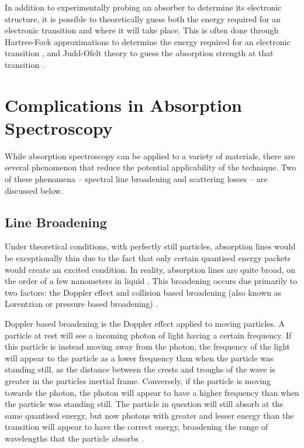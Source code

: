 In addition to experimentally probing an absorber to determine its electronic
structure, it is possible to theoretically guess both the energy required for
an electronic transition and where it will take place. This is often done
through Hartree-Fock approximations to determine the energy required for an
electronic transition \cite{Szabo:1996tu}, and Judd-Ofelt theory to guess the
absorption strength at that transition \cite{Judd:1962uq}.



\section{Complications in Absorption Spectroscopy}\label{sec:comp_abs}

While absorption spectroscopy can be applied to a variety of materials, there
are several phenomenon that reduce the potential applicability of the
technique. Two of these phenomena -- spectral line broadening and scattering
losses -- are discussed below.



\subsection{Line Broadening}\label{subsec:line_broad}

Under theoretical conditions, with perfectly still particles, absorption lines
would be exceptionally thin due to the fact that only certain quantised energy
packets would create an excited condition. In reality, absorption lines are
quite broad, on the order of a few nanometers in liquid \cite{Hollas:2004uh}.
This broadening occurs due primarily to two factors: the Doppler effect
and collision based broadening (also known as Lorentzian or pressure based
broadening) \cite{Olivero:1977ul}.

Doppler based broadening is the Doppler effect applied to moving particles.
A particle at rest will see a incoming photon of light having a certain
frequency. If this particle is instead moving away from the photon, the
frequency of the light will appear to the particle as a lower frequency than
when the particle was standing still, as the distance between the crests and
troughs of the wave is greater in the particles inertial frame. Conversely,
if the particle is moving towards the photon, the photon will appear to have
a higher frequency than when the particle was standing still. The particle
in question will still absorb at the same quantised energy, but now photons
with greater and lesser energy than the transition will appear to have the
correct energy, broadening the range of wavelengths that the particle absorbs
\cite{Fox:2006uy}.

